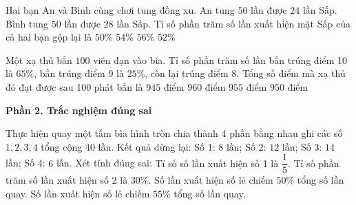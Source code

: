 \begin{ex} %
Hai bạn An và Bình cùng chơi tung đồng xu. An tung $50$ lần được $24$ lần Sấp. Bình tung $50$ lần được $28$ lần Sấp. Tỉ số phần trăm số lần xuất hiện mặt Sấp của cả hai bạn gộp lại là
\choice
{$50\%$}
{$54\%$}
{$56\%$}
{\True $52\%$}
\end{ex}

\begin{ex} %
Một xạ thủ bắn $100$ viên đạn vào bia. Tỉ số phần trăm số lần bắn trúng điểm 10 là $65\%$, bắn trúng điểm 9 là $25\%$, còn lại trúng điểm 8. Tổng số điểm mà xạ thủ đó đạt được sau 100 phát bắn là
\choice
{$945$ điểm}
{$960$ điểm}
{\True $955$ điểm}
{$950$ điểm}
\end{ex}

\textbf{Phần 2. Trắc nghiệm đúng sai}

\begin{ex} %
Thực hiện quay một tấm bìa hình tròn chia thành 4 phần bằng nhau ghi các số $1, 2, 3, 4$ tổng cộng $40$ lần. Kết quả dừng lại: Số 1: $8$ lần; Số 2: $12$ lần; Số 3: $14$ lần; Số 4: $6$ lần. Xét tính đúng sai:
\choiceTF
{\True Tỉ số số lần xuất hiện số 1 là $\dfrac{1}{5}$.}
{\True Tỉ số phần trăm số lần xuất hiện số 2 là $30\%$.}
{Số lần xuất hiện số lẻ chiếm $50\%$ tổng số lần quay.}
{\True Số lần xuất hiện số lẻ chiếm $55\%$ tổng số lần quay.}
\end{ex}

